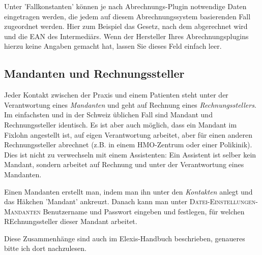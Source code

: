 \documentclass[a4paper]{scrartcl}
\begin{document}
Unter 'Fallkonstanten' können je nach Abrechnungs-Plugin notwendige Daten eingetragen werden, die jedem auf diesem Abrechnungssystem basierenden Fall zugeordnet werden. Hier zum Beispiel das Gesetz, nach dem abgerechnet wird und die EAN des Intermediärs. Wenn der Hersteller Ihres Abrechnungsplugins hierzu keine Angaben gemacht hat, lassen Sie dieses Feld einfach leer.


\subsection{Mandanten und Rechnungssteller}
Jeder Kontakt zwischen der Praxis und einem Patienten steht unter der Verantwortung eines \textit{Mandanten} und geht auf Rechnung eines \textit{Rechnungsstellers}. Im einfachsten und in der Schweiz üblichen Fall sind Mandant und Rechnungssteller identisch. Es ist aber auch möglich, dass ein Mandant im Fixlohn angestellt ist, auf eigen Verantwortung arbeitet, aber für einen anderen Rechnungssteller abrechnet (z.B. in einem HMO-Zentrum oder einer Polikinik). Dies ist nicht zu verwechseln mit einem Assistenten: Ein Assistent ist selber kein Mandant, sondern arbeitet auf Rechnung und unter der Verantwortung eines Mandanten.

\medskip

Einen Mandanten erstellt man, indem man ihn unter den \textit{Kontakten} anlegt und das Häkchen 'Mandant' ankreuzt. Danach kann man unter \textsc{Datei-Einstellungen-Mandanten} Benutzername und Passwort eingeben und festlegen, für welchen REchnungssteller dieser Mandant arbeitet.

Diese Zusammenhänge sind auch im Elexis-Handbuch beschrieben, genaueres bitte ich dort nachzulesen.

\medskip
\end{document}

